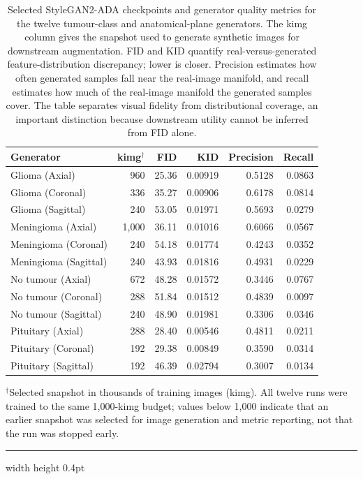 \documentclass[conference,twoside]{IEEEtran}
\newcommand{\figfont}{\sffamily}
\DeclareRobustCommand{\plotmathversion}{}
\DeclareRobustCommand{\plotmathversion}{\mathversion{plotsans}}
\newcommand{\floatcaprule}{}
\newcommand{\tabnoterule}{%
  \par\vspace{1pt}%
  \hrule width \linewidth height 0.4pt%
}
\newcommand{\plotfigurefont}{\figfont\plotmathversion}
\begin{document}
\begin{table}[!tbp]
  \floatcaprule
\caption{Selected StyleGAN2-ADA checkpoints and generator quality metrics for the twelve tumour-class and anatomical-plane generators. The kimg column gives the snapshot used to generate synthetic images for downstream augmentation. FID and KID quantify real-versus-generated feature-distribution discrepancy; lower is closer. Precision estimates how often generated samples fall near the real-image manifold, and recall estimates how much of the real-image manifold the generated samples cover. The table separates visual fidelity from distributional coverage, an important distinction because downstream utility cannot be inferred from FID alone.}
\label{tab:gan-selected-metrics}
\centering
\normalfont\plotfigurefont\scriptsize
\begin{tabularx}{\linewidth}{Yrrrrr}
\toprule
Generator & kimg$^{\dagger}$ & FID & KID & Precision & Recall \\
\midrule
Glioma (Axial) & 960 & 25.36 & 0.00919 & 0.5128 & 0.0863 \\
Glioma (Coronal) & 336 & 35.27 & 0.00906 & 0.6178 & 0.0814 \\
Glioma (Sagittal) & 240 & 53.05 & 0.01971 & 0.5693 & 0.0279 \\
Meningioma (Axial) & 1,000 & 36.11 & 0.01016 & 0.6066 & 0.0567 \\
Meningioma (Coronal) & 240 & 54.18 & 0.01774 & 0.4243 & 0.0352 \\
Meningioma (Sagittal) & 240 & 43.93 & 0.01816 & 0.4931 & 0.0229 \\
No tumour (Axial) & 672 & 48.28 & 0.01572 & 0.3446 & 0.0767 \\
No tumour (Coronal) & 288 & 51.84 & 0.01512 & 0.4839 & 0.0097 \\
No tumour (Sagittal) & 240 & 48.90 & 0.01981 & 0.3306 & 0.0346 \\
Pituitary (Axial) & 288 & 28.40 & 0.00546 & 0.4811 & 0.0211 \\
Pituitary (Coronal) & 192 & 29.38 & 0.00849 & 0.3590 & 0.0314 \\
Pituitary (Sagittal) & 192 & 46.39 & 0.02794 & 0.3007 & 0.0134 \\
\bottomrule
\end{tabularx}
{\normalfont\plotfigurefont\scriptsize\raggedright $^{\dagger}$Selected snapshot in thousands of training images (kimg). All twelve runs were trained to the same 1,000-kimg budget; values below 1,000 indicate that an earlier snapshot was selected for image generation and metric reporting, not that the run was stopped early.\par}
\tabnoterule
\end{table}
\end{document}

